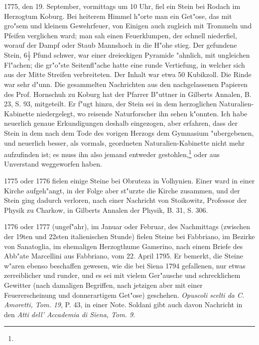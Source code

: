 \documentclass[a4paper, 11pt, oneside, polutonikogreek, german]{article}
\begin{document}
1775, den 19. September, vormittags um 10 Uhr, fiel ein Stein bei Rodach im Herzogtum Koburg. Bei heiterem Himmel h"orte man ein Get"ose, das mit gro"sem und kleinem Gewehrfeuer, von Einigen auch zugleich mit Trommeln und Pfeifen verglichen ward; man sah einen Feuerklumpen, der schnell niederfiel, worauf der Dampf oder Staub Mannshoch in die H"ohe stieg. Der gefundene Stein, $\mathfrak{6\frac{1}{2}}$ Pfund schwer, war einer dreieckigen Pyramide "ahnlich, mit ungleichen Fl"achen; die gr"o"ste Seitenfl"ache hatte eine runde Vertiefung, in welcher sich aus der Mitte Streifen verbreiteten. Der Inhalt war etwa 50 Kubikzoll. Die Rinde war sehr d"unn. Die gesammelten Nachrichten aus den nachgelassenen Papieren des Prof. Hornschuh zu Koburg hat der Pfarrer B"uttner in Gilberts Annalen, B. 23, S. 93, mitgeteilt. Er f"ugt hinzu, der Stein sei in dem herzoglichen Naturalien-Kabinette niedergelegt, wo reisende Naturforscher ihn sehen k"onnten. Ich habe neuerlich genaue Erkundigungen deshalb eingezogen, aber erfahren, dass der Stein in dem nach dem Tode des vorigen Herzogs dem Gymnasium "ubergebenen, und neuerlich besser, als vormals, geordneten Naturalien-Kabinette nicht mehr aufzufinden ist; es muss ihn also jemand entweder gestohlen,\footnote{} oder aus Unverstand weggeworfen haben.

1775 oder 1776 fielen einige Steine bei Obruteza in Volhynien. Einer ward in einer Kirche aufgeh"angt, in der Folge aber st"urzte die Kirche zusammen, und der Stein ging dadurch verloren, nach einer Nachricht von Stoikowitz, Professor der Physik zu Charkow, in Gilberts Annalen der Physik, B. 31, S. 306.

1776 oder 1777 (ungef"ahr), im Januar oder Februar, des Nachmittags (zwischen der 19ten und 22sten italienischen Stunde) fielen Steine bei Fabbriano, im Bezirke von Sanatoglia, im ehemaligen Herzogthume Gamerino, nach einem Briefe des Abb"ate Marcellini aus Fabbriano, vom 22. April 1795. Er bemerkt, die Steine w"aren ebenso beschaffen gewesen, wie die bei Siena 1794 gefallenen, nur etwas zerreiblicher und runder, und es sei mit vielem Ger"ausche und schrecklichem Gewitter (nach damaligen Begriffen, nach jetzigen aber mit einer Feuererscheinung und donnerartigem Get"ose) geschehen. \emph{Opuscoli scelti da C. Amoretti, Tom. 19}, P. 43, in einer Note. Soldani gibt auch davon Nachricht in den \emph{Atti dell' Accademia di Siena, Tom. 9.}
\end{document}
